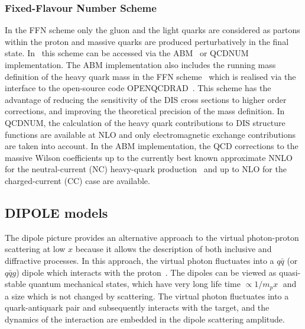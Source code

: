\subsubsection {Fixed-Flavour Number Scheme}

In the FFN scheme only the gluon and the light quarks are considered
as partons within the proton and massive quarks are produced perturbatively in the final state.
In \fitter\ this scheme can be accessed via the ABM~\cite{openqcdrad:page} or
QCDNUM implementation.
The ABM implementation also includes the running mass definition of the heavy quark mass 
in the FFN scheme~\cite{Alekhin:runm} which is realised via the interface to the 
open-source code OPENQCDRAD~\cite{openqcdrad:page}.
This scheme has the advantage of reducing the sensitivity of the DIS cross sections to
higher order corrections, and improving the theoretical precision of the mass definition. 
In QCDNUM, the calculation of the heavy quark contributions to DIS structure functions
are available at NLO and only electromagnetic exchange contributions are taken into account.
In the ABM implementation, the QCD corrections to the massive Wilson coefficients 
up to the currently best known approximate NNLO for the neutral-current (NC) 
heavy-quark production~\cite{SMoch:npb864} and up to NLO
for the charged-current (CC) case are available.
%
\subsection{DIPOLE models}

The dipole picture provides an alternative approach to the virtual photon-proton
 scattering at low $x$  because it allows the description of both inclusive and 
diffractive processes.
 In this approach, the virtual photon fluctuates into a $q\bar q$ (or $q\bar q g$) 
 dipole which interacts with the proton~\cite{NNZ:91}.  
The dipoles can be viewed as quasi-stable quantum mechanical states, which have very long 
life time $\propto 1/m_p x\;$ and a size which is not changed by scattering.
The virtual photon fluctuates into a quark-antiquark pair and subsequently interacts with the target, 
and the dynamics of the interaction are embedded in the dipole scattering amplitude.



